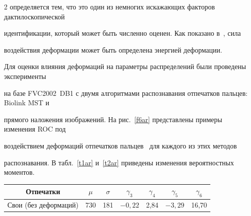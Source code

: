 \begin{multicols}{2}
определяется тем, что это один из немногих искажающих факторов дактилоскопической 


идентификации, который может быть численно оценен. Как показано в~\cite{10ar, 11ar}, сила 


воздействия деформации может быть определена энергией деформации. 


  


  Для оценки влияния деформаций на параметры распределений были проведены эксперименты 


на базе FVC2002~DB1 с двумя алгоритмами распознавания отпечатков пальцев: Biolink MST и 


прямого наложения изображений. На рис.~\ref{f6ar} представлены примеры изменения ROC под 


воздействием деформаций отпечатков пальцев~\cite{9ar, 10ar} для каждого из этих методов 


распознавания. В табл.~\ref{t1ar} и~\ref{t2ar} приведены изменения вероятностных моментов.








  


\begin{table}\small


\begin{center}


\parbox{105mm}{





}





\vspace*{2ex}





\begin{tabular}{|l|c|c|c|c|c|c|}


\hline


\multicolumn{1}{|c|}{Отпечатки}&$\mu $&$\sigma$&$\gamma_3$&$\gamma_4$&$\gamma_5$&$\gamma_6$\\


\hline


Свои (без деформаций)&730&181&$-0{,}22$&2,84&$-3{,}29$&16,70\\



\end{tabular}
\end{center}
\end{table}
\end{multicols}
